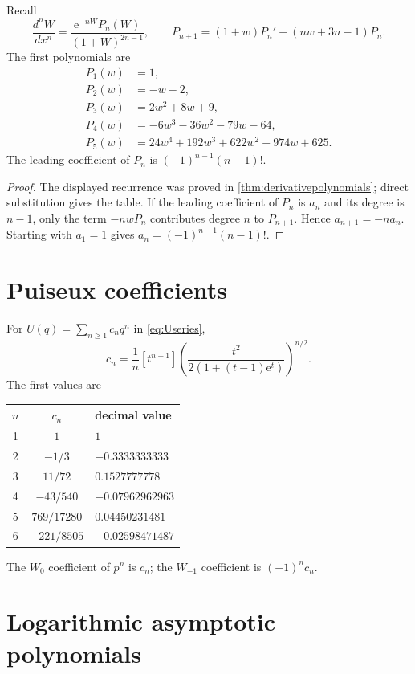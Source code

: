 \documentclass[11pt,oneside]{book}
\theoremstyle{definition}
\theoremstyle{remark}
\newcommand{\ee}{\mathrm e}
\begin{document}
Recall
\[
 \frac{d^nW}{dx^n}
 =\frac{\ee^{-nW}P_n(W)}{(1+W)^{2n-1}},
 \qquad
 P_{n+1}=(1+w)P_n'-(nw+3n-1)P_n.
\]
The first polynomials are
\begin{align*}
 P_1(w)&=1,\\
 P_2(w)&=-w-2,\\
 P_3(w)&=2w^2+8w+9,\\
 P_4(w)&=-6w^3-36w^2-79w-64,\\
 P_5(w)&=24w^4+192w^3+622w^2+974w+625.
\end{align*}
The leading coefficient of $P_n$ is $(-1)^{n-1}(n-1)!$.

\begin{proof}
The displayed recurrence was proved in \cref{thm:derivativepolynomials}; direct
substitution gives the table.  If the leading coefficient of $P_n$ is $a_n$
and its degree is $n-1$, only the term $-nwP_n$ contributes degree $n$ to
$P_{n+1}$.  Hence $a_{n+1}=-na_n$.  Starting with $a_1=1$ gives
$a_n=(-1)^{n-1}(n-1)!$.
\end{proof}

\section{Puiseux coefficients}

For $U(q)=\sum_{n\ge1}c_nq^n$ in \eqref{eq:Useries},
\[
 c_n=\frac1n[t^{n-1}]
 \left(
 \frac{t^2}{2(1+(t-1)\ee^t)}
 \right)^{n/2}.
\]
The first values are
\begin{center}
\begin{tabular}{@{}ccl@{}}
\toprule
$n$ & $c_n$ & decimal value\\
\midrule
1 & $1$ & $1$\\
2 & $-1/3$ & $-0.3333333333$\\
3 & $11/72$ & $0.1527777778$\\
4 & $-43/540$ & $-0.07962962963$\\
5 & $769/17280$ & $0.04450231481$\\
6 & $-221/8505$ & $-0.02598471487$\\
\bottomrule
\end{tabular}
\end{center}
The $W_0$ coefficient of $p^n$ is $c_n$; the $W_{-1}$ coefficient is
$(-1)^nc_n$.

\section{Logarithmic asymptotic polynomials}
\end{document}
